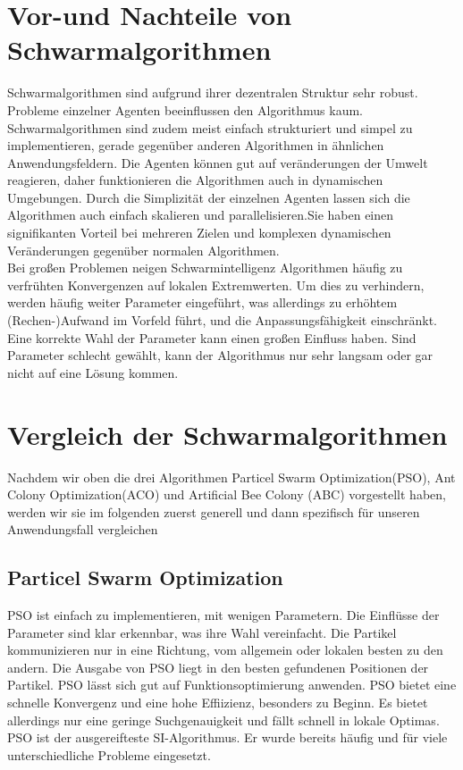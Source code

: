 \section{Vor-und Nachteile von Schwarmalgorithmen}
Schwarmalgorithmen sind aufgrund ihrer dezentralen Struktur sehr robust. Probleme einzelner Agenten beeinflussen den Algorithmus kaum. Schwarmalgorithmen sind zudem meist einfach strukturiert und simpel zu implementieren, gerade gegenüber anderen Algorithmen in ähnlichen Anwendungsfeldern. Die Agenten können gut auf veränderungen der Umwelt reagieren, daher funktionieren die Algorithmen auch in dynamischen Umgebungen. Durch die Simplizität der einzelnen Agenten lassen sich die Algorithmen auch einfach skalieren und parallelisieren.Sie haben einen signifikanten Vorteil bei mehreren Zielen und komplexen dynamischen Veränderungen gegenüber normalen Algorithmen. \\

Bei großen Problemen neigen Schwarmintelligenz Algorithmen häufig zu verfrühten Konvergenzen auf lokalen Extremwerten. Um dies zu verhindern, werden häufig weiter Parameter eingeführt, was allerdings zu erhöhtem (Rechen-)Aufwand im Vorfeld führt, und die Anpassungsfähigkeit einschränkt.\cite {wu2022review} Eine korrekte Wahl der Parameter kann einen großen Einfluss haben. Sind Parameter schlecht gewählt, kann der Algorithmus nur sehr langsam oder gar nicht auf eine Lösung kommen.

\section{Vergleich der Schwarmalgorithmen}

Nachdem wir oben die drei Algorithmen Particel Swarm Optimization(PSO), Ant Colony Optimization(ACO) und  Artificial Bee Colony (ABC) vorgestellt haben, werden wir sie im folgenden zuerst generell und dann spezifisch für unseren Anwendungsfall vergleichen\\

\subsection{Particel Swarm Optimization}
PSO ist einfach zu implementieren, mit wenigen Parametern. Die Einflüsse der Parameter sind klar erkennbar, was ihre Wahl vereinfacht. Die Partikel kommunizieren nur in eine Richtung, vom allgemein oder lokalen besten zu den andern. Die Ausgabe von PSO liegt in den besten gefundenen Positionen der Partikel. PSO lässt sich gut auf Funktionsoptimierung anwenden. PSO bietet eine schnelle Konvergenz und eine hohe Effiizienz, besonders zu Beginn. Es bietet allerdings nur eine geringe Suchgenauigkeit und fällt schnell in lokale Optimas. \cite {yu2015swarm} PSO ist der ausgereifteste SI-Algorithmus. Er wurde bereits häufig und für viele unterschiedliche Probleme eingesetzt. 


